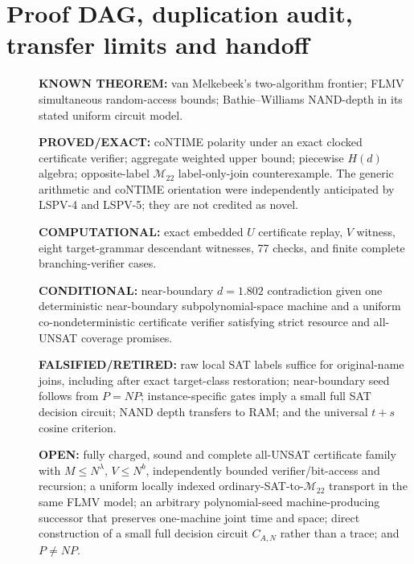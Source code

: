\documentclass[11pt]{article}
\begin{document}
\section{Proof DAG, duplication audit, transfer limits and handoff}
\begin{description}
\item[] \textbf{KNOWN THEOREM:} van Melkebeek's two-algorithm frontier;
FLMV simultaneous random-access bounds; Bathie--Williams NAND-depth
in its stated uniform circuit model.
\item[] \textbf{PROVED/EXACT:} coNTIME polarity under an exact clocked
certificate verifier; aggregate weighted upper bound; piecewise
$H(d)$ algebra; opposite-label $\mathcal M_{22}$ label-only-join counterexample.
The generic arithmetic and coNTIME orientation were independently
anticipated by LSPV-4 and LSPV-5; they are not credited as novel.
\item[] \textbf{COMPUTATIONAL:} exact embedded $U$ certificate replay,
$V$ witness, eight target-grammar descendant witnesses, 77 checks,
and finite complete branching-verifier cases.
\item[] \textbf{CONDITIONAL:} near-boundary $d=1.802$ contradiction given
one deterministic near-boundary subpolynomial-space machine and a
uniform co-nondeterministic certificate verifier satisfying strict
resource and all-UNSAT coverage promises.
\item[] \textbf{FALSIFIED/RETIRED:} raw local SAT labels suffice for
original-name joins, including after exact target-class restoration;
near-boundary seed follows from $P=NP$; instance-specific gates imply
a small full SAT decision circuit; NAND depth transfers to RAM; and
the universal $t+s$ cosine criterion.
\item[] \textbf{OPEN:} fully charged, sound and complete all-UNSAT
certificate family with $M\le N^\lambda$, $V\le N^b$, independently
bounded verifier/bit-access and recursion; a uniform locally indexed
ordinary-SAT-to-$\mathcal M_{22}$ transport in the same FLMV model;
an arbitrary polynomial-seed machine-producing successor that preserves
one-machine joint time and space; direct construction of a small
full decision circuit $C_{A,N}$ rather than a trace; and $P\ne NP$.
\end{description}
\end{document}
